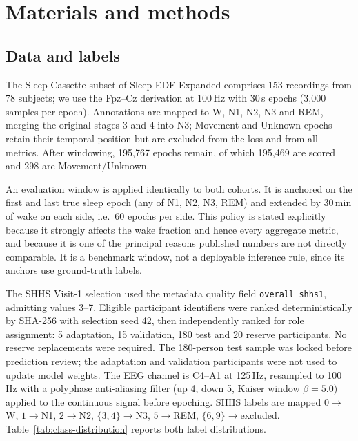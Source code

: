 \documentclass[11pt,a4paper]{article}
\begin{document}
\section{Materials and methods}

\subsection{Data and labels}

The Sleep Cassette subset of Sleep-EDF Expanded comprises 153 recordings from 78 subjects; we use the
Fpz--Cz derivation at 100\,Hz with 30\,s epochs (3{,}000 samples per epoch). Annotations are mapped to
W, N1, N2, N3 and REM, merging the original stages 3 and 4 into N3; Movement and Unknown epochs retain their temporal position but are excluded from
the loss and from all metrics. After windowing, 195{,}767 epochs remain, of which 195{,}469 are scored
and 298 are Movement/Unknown.

An evaluation window is applied identically to both cohorts. It is anchored on the first and last true
sleep epoch (any of N1, N2, N3, REM) and extended by 30\,min of wake on each side, i.e.\ 60 epochs per
side. This policy is stated explicitly because it strongly affects the wake fraction and hence every
aggregate metric, and because it is one of the principal reasons published numbers are not directly
comparable. It is a benchmark window, not a deployable inference rule, since its anchors use ground-truth
labels.

The SHHS Visit-1 selection used the metadata quality field \texttt{overall\_shhs1}, admitting values
3--7. Eligible participant identifiers were ranked deterministically by SHA-256 with selection seed 42,
then independently ranked for role assignment: 5 adaptation, 15 validation, 180 test and 20 reserve
participants. No reserve replacements were required. The 180-person test sample was locked before
prediction review; the adaptation and validation participants were not used to update model weights.
The EEG channel is C4--A1 at 125\,Hz, resampled to 100\,Hz with a polyphase anti-aliasing
filter (up 4, down 5, Kaiser window $\beta = 5.0$) applied to the continuous signal before epoching.
SHHS labels are mapped $0\rightarrow$W, $1\rightarrow$N1, $2\rightarrow$N2, $\{3,4\}\rightarrow$N3,
$5\rightarrow$REM, $\{6,9\}\rightarrow$excluded. Table~\ref{tab:class-distribution} reports both label
distributions.
\end{document}
